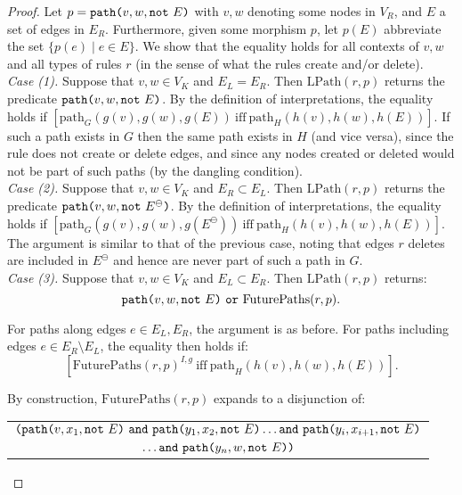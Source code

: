 \documentclass{llncs}
\newcommand{\mt}[1]{\text{\tt{#1}}}
\begin{document}
	\begin{proof}
		Let $p = \mathtt{path}\mt{(}v,w,\mathtt{not}\ E\mt{)}$ with $v,w$ denoting some nodes in $V_R$, and $E$ a set of edges in $E_R$. Furthermore, given some morphism $p$, let $p(E)$ abbreviate the set $\{p(e) \mid e\in E\}$. We show that the equality holds for all contexts of $v,w$ and all types of rules $r$ (in the sense of what the rules create and/or delete).\\
		
		\noindent\emph{Case (1).} Suppose that $v,w\in V_K$ and $E_L = E_R$. Then $\text{LPath}(r,p)$ returns the predicate $\mathtt{path}\mt{(}v,w,\mathtt{not}\ E\mt{)}$. By the definition of interpretations, the equality holds if $\left[\text{path}_G(g(v),g(w),g(E))\ \text{iff}\ \text{path}_H(h(v),h(w),h(E))\right]$. If such a path exists in $G$ then the same path exists in $H$ (and vice versa), since the rule does not create or delete edges, and since any nodes created or deleted would not be part of such paths (by the dangling condition).\\
		
		\noindent\emph{Case (2).} Suppose that $v,w\in V_K$ and $E_R \subset E_L$. Then $\text{LPath}(r,p)$ returns the predicate $\mathtt{path}\mt{(}v,w,\mathtt{not}\ E^\ominus\mt{)}$. By the definition of interpretations, the equality holds if $\left[\text{path}_G(g(v),g(w),g(E^\ominus))\ \text{iff}\ \text{path}_H(h(v),h(w),h(E))\right]$. The argument is similar to that of the previous case, noting that edges $r$ deletes are included in $E^\ominus$ and hence are never part of such a path in $G$.\\
		
		\noindent\emph{Case (3).} Suppose that $v,w\in V_K$ and $E_L\subset E_R$. Then $\text{LPath}(r,p)$ returns:
		\[ \mathtt{path}\mt{(}v,w,\mathtt{not}\ E\mt{)}\ \mathtt{or}\ \text{FuturePaths}(r,p). \]
		
		\noindent For paths along edges $e\in E_L,E_R$, the argument is as before. For paths including edges $e\in E_R\setminus E_L$, the equality then holds if:
		\[\left[\text{FuturePaths}(r,p)^{I,g}\ \text{iff}\ \text{path}_H(h(v),h(w),h(E))\right].\]
		
		\noindent By construction, $\text{FuturePaths}(r,p)$ expands to a disjunction of:
		\begin{center}
			\begin{tabular}{c}
				$\mt{(}\mathtt{path}\mt{(}v,x_1,\mathtt{not}\ E\mt{)}\ \mathtt{and}\ \mathtt{path}\mt{(}y_1,x_2,\mathtt{not}\ E\mt{)} \dots \mathtt{and}\ \mathtt{path}\mt{(}y_i,x_{i+1},\mathtt{not}\ E\mt{)}$\\
				$\dots \mathtt{and}\ \mathtt{path}\mt{(}y_n,w,\mathtt{not}\ E\mt{)}\mt{)}$
			\end{tabular}
		\end{center}


\end{proof}
\end{document}
